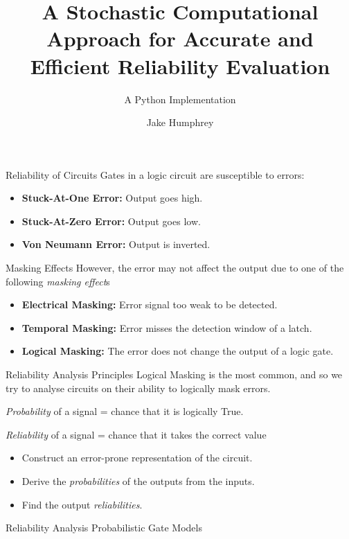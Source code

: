 \documentclass[12pt]{beamer}
\author{Jake Humphrey}
\title{A Stochastic Computational Approach for Accurate and Efficient Reliability Evaluation}
\subtitle{A Python Implementation}
\institute{Department of Electronic and Electrical Engineering\\
  Imperial College London\\
  \texttt{jbh111@ic.ac.uk}
}
\begin{document}
\begin{frame}[plain]
  \titlepage
\end{frame}

\begin{frame}{Reliability of Circuits}
Gates in a logic circuit are susceptible to errors:
\begin{itemize}
\item \textbf{Stuck-At-One Error:} Output goes high.
\item \textbf{Stuck-At-Zero Error:} Output goes low.
\item \textbf{Von Neumann Error:} Output is inverted.
\end{itemize}
\end{frame}

\begin{frame}{Masking Effects}
However, the error may not affect the output due to one of the following \emph{masking effect}s
\begin{itemize}
\item \textbf{Electrical Masking:} Error signal too weak to be detected.
\item \textbf{Temporal Masking:} Error misses the detection window of a latch.
\item \textbf{Logical Masking:} The error does not change the output of a logic gate.
\end{itemize}
\end{frame}
\begin{frame}{Reliability Analysis \small Principles}
Logical Masking is the most common, and so we try to analyse circuits on their ability to logically mask errors.
\vspace{0.25cm}

\emph{Probability} of a signal = chance that it is logically True.

\emph{Reliability} of a signal = chance that it takes the correct value
\vspace{0.25cm}

\begin{itemize}
\item Construct an error-prone representation of the circuit.
\item Derive the \emph{probabilities} of the outputs from the inputs.
\item Find the output \emph{reliabilities}.
\end{itemize}
\end{frame}

\begin{frame}{Reliability Analysis \small Probabilistic Gate Models}
\end{frame}
\end{document}
